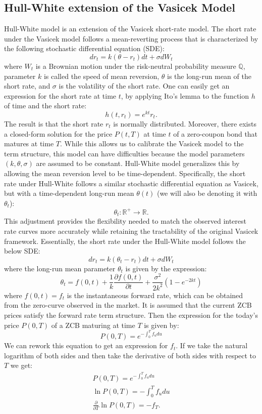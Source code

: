 \documentclass[titlepage, 12pt]{article}
\newcommand{\R}{\mathbb{R}}
\begin{document}
	\subsection{Hull-White extension of the Vasicek Model}
	Hull-White model is an extension of the Vasicek short-rate model. The
	short rate under the Vasicek model follows a mean-reverting process that
	is characterized by the following stochastic differential equation
	(SDE):
	$$dr_t = k(\theta - r_t)dt + \sigma dW_t$$
	where \(W_t\) is a Brownian motion under the risk-neutral probability
	measure \(\mathbb{Q}\), parameter \(k\) is called the speed of mean
	reversion, \(\theta\) is the long-run mean of the short rate, and
	\(\sigma\) is the volatility of the short rate. One can easily get an
	expression for the short rate at time \(t\), by applying Ito's lemma to the
	function \(h\) of time and the short rate:
	\[h(t, r_t) = e^{kt}r_t.\]
	The result is that the short rate \(r_t\) is normally
	distributed. Moreover, there exists a closed-form solution for the price
	\(P(t,T)\) at time \(t\) of a zero-coupon bond that matures at time
	\(T\). While this allows us to calibrate the Vasicek model to the term
	structure, this model can have difficulties because the model parameters
	\((k,\theta,\sigma)\) are assumed to be constant. Hull-White model
	generalizes this by allowing the mean reversion level to be
	time-dependent. Specifically, the short rate under Hull-White follows a
	similar stochastic differential equation as Vasicek, but with a
	time-dependent long-run mean \(\theta(t)\) (we will also be denoting it with $\theta_t$):
	\[\theta_t: \R^+\rightarrow \mathbb{R}.\]
	This adjustment provides the flexibility needed to match the observed
	interest rate curves more accurately while retaining the tractability of
	the original Vasicek framework.	Essentially, the short rate under the Hull-White model follows the below
	SDE:
	\[dr_t = k(\theta_t - r_t)dt + \sigma dW_t\]
	where the long-run mean parameter \(\theta_t\) is given by the
	expression:
	\begin{equation}\label{eq:theta_hw}
		\theta_t = f(0,t) + \frac{1}{k}\frac{\partial f(0,t)}{\partial t}+\frac{\sigma^2}{2k^2}(1-e^{-2kt})
	\end{equation}
	where \(f(0,t)=f_t\) is the instantaneous forward rate, which can be
	obtained from the zero-curve observed in the market. It is assumed
	that the current ZCB prices satisfy the forward rate term structure. Then the expression for the today's price $P(0,T)$ of a ZCB maturing at time $T$ is given by:
	\begin{equation}\label{eq:bond_price_f}
		P(0,T) = e^{-\int_0^Tf_u du}
	\end{equation}
	We can rework this equation to get an expression for \(f_t\). If we take the natural logarithm of both sides and then take the derivative of both sides with respect to $T$ we get:
	\begin{equation}
		\begin{split}
			P(0,T) = e^{-\int_0^Tf_u du} \\
			\ln P(0,T) = -\int_0^Tf_u du \\
			\frac{\partial}{\partial T}\ln P(0,T) = - f_T .
		\end{split}
	\end{equation}
	
\end{document}
